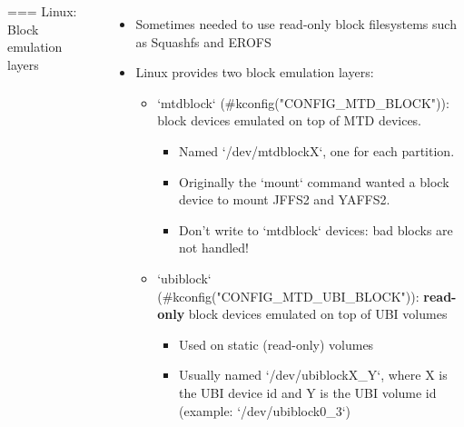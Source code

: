 \begin{columns}
=== Linux: Block emulation layers
  \begin{itemize}
  \item Sometimes needed to use read-only block filesystems such as Squashfs and EROFS
  \item Linux provides two block emulation layers:
    \begin{itemize}
    \item `mtdblock` (#kconfig("CONFIG_MTD_BLOCK")):
       block devices emulated on top of MTD devices.
       \begin{itemize}
       \item Named `/dev/mtdblockX`, one for each partition.
       \item Originally the `mount` command wanted a block device to mount JFFS2 and YAFFS2.
       \item Don't write to `mtdblock` devices: bad blocks are not handled!
       \end{itemize}
    \item `ubiblock` (#kconfig("CONFIG_MTD_UBI_BLOCK")):
       {\bf read-only} block devices emulated on top of UBI volumes
       \begin{itemize}
       \item Used on static (read-only) volumes
       \item Usually named `/dev/ubiblockX_Y`, where X is the UBI device
             id and Y is the UBI volume id (example: `/dev/ubiblock0_3`)
       \end{itemize}
    \end{itemize}
  \end{itemize}
\end{columns}